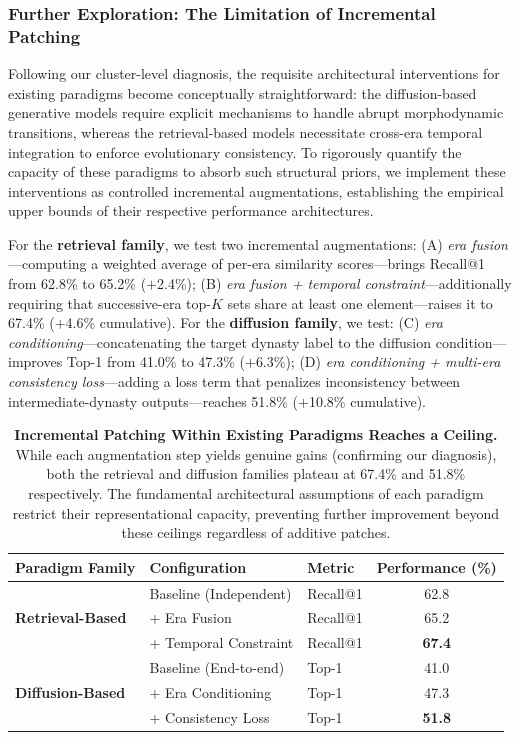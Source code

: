 \documentclass{article}
\begin{document}
\subsubsection{Further Exploration: The Limitation of Incremental Patching}
\label{sec:pre:s10}

Following our cluster-level diagnosis, the requisite architectural interventions for existing paradigms become conceptually straightforward: the diffusion-based generative models require explicit mechanisms to handle abrupt morphodynamic transitions, whereas the retrieval-based models necessitate cross-era temporal integration to enforce evolutionary consistency. To rigorously quantify the capacity of these paradigms to absorb such structural priors, we implement these interventions as controlled incremental augmentations, establishing the empirical upper bounds of their respective performance architectures.

For the \textbf{retrieval family}, we test two incremental augmentations: (A) \emph{era fusion}—computing a weighted average of per-era similarity scores—brings Recall@1 from 62.8\% to 65.2\% ($+$2.4\%); (B) \emph{era fusion + temporal constraint}—additionally requiring that successive-era top-$K$ sets share at least one element—raises it to 67.4\% ($+$4.6\% cumulative). For the \textbf{diffusion family}, we test: (C) \emph{era conditioning}—concatenating the target dynasty label to the diffusion condition—improves Top-1 from 41.0\% to 47.3\% ($+$6.3\%); (D) \emph{era conditioning + multi-era consistency loss}—adding a loss term that penalizes inconsistency between intermediate-dynasty outputs—reaches 51.8\% ($+$10.8\% cumulative).

\begin{table}[h]
  \centering
  \caption{\textbf{Incremental Patching Within Existing Paradigms Reaches a Ceiling.} While each augmentation step yields genuine gains (confirming our diagnosis), both the retrieval and diffusion families plateau at 67.4\% and 51.8\% respectively. The fundamental architectural assumptions of each paradigm restrict their representational capacity, preventing further improvement beyond these ceilings regardless of additive patches.}
  \label{tab:pre:patching}
  \begin{tabular}{lllc}
    \toprule
    \textbf{Paradigm Family} & \textbf{Configuration} & \textbf{Metric} & \textbf{Performance (\%)} \\
    \midrule
    \multirow{3}{*}{\textbf{Retrieval-Based}} & Baseline (Independent) & Recall@1 & 62.8 \\
    & + Era Fusion & Recall@1 & 65.2 \\
    & + Temporal Constraint & Recall@1 & \textbf{67.4} \\
    \midrule
    \multirow{3}{*}{\textbf{Diffusion-Based}} & Baseline (End-to-end) & Top-1 & 41.0 \\
    & + Era Conditioning & Top-1 & 47.3 \\
    & + Consistency Loss & Top-1 & \textbf{51.8} \\
    \bottomrule
  \end{tabular}
\end{table}
\end{document}

